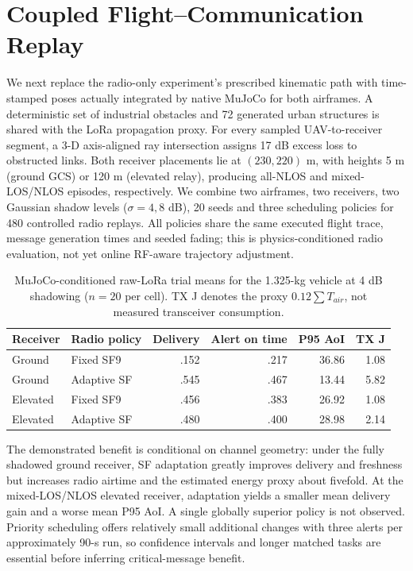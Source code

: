 \documentclass[conference]{IEEEtran}
\begin{document}
\section{Coupled Flight--Communication Replay}
We next replace the radio-only experiment's prescribed kinematic path with time-stamped poses actually integrated by native MuJoCo for both airframes. A deterministic set of industrial obstacles and 72 generated urban structures is shared with the LoRa propagation proxy. For every sampled UAV-to-receiver segment, a 3-D axis-aligned ray intersection assigns 17 dB excess loss to obstructed links. Both receiver placements lie at $(230,220)$ m, with heights 5 m (ground GCS) or 120 m (elevated relay), producing all-NLOS and mixed-LOS/NLOS episodes, respectively. We combine two airframes, two receivers, two Gaussian shadow levels ($\sigma=4,8$ dB), 20 seeds and three scheduling policies for 480 controlled radio replays. All policies share the same executed flight trace, message generation times and seeded fading; this is physics-conditioned radio evaluation, not yet online RF-aware trajectory adjustment.
\begin{table}[t]\centering\caption{MuJoCo-conditioned raw-LoRa trial means for the 1.325-kg vehicle at 4 dB shadowing ($n=20$ per cell). TX J denotes the proxy $0.12 \sum T_{air}$, not measured transceiver consumption.}\label{tab:crosslayer}
\begin{tabular}{llrrrr}\toprule
Receiver & Radio policy & Delivery & Alert on time & P95 AoI & TX J\\\midrule
Ground & Fixed SF9 & .152 & .217 & 36.86 & 1.08\\
Ground & Adaptive SF & .545 & .467 & 13.44 & 5.82\\
Elevated & Fixed SF9 & .456 & .383 & 26.92 & 1.08\\
Elevated & Adaptive SF & .480 & .400 & 28.98 & 2.14\\
\bottomrule\end{tabular}\end{table}
The demonstrated benefit is conditional on channel geometry: under the fully shadowed ground receiver, SF adaptation greatly improves delivery and freshness but increases radio airtime and the estimated energy proxy about fivefold. At the mixed-LOS/NLOS elevated receiver, adaptation yields a smaller mean delivery gain and a worse mean P95 AoI. A single globally superior policy is not observed. Priority scheduling offers relatively small additional changes with three alerts per approximately 90-s run, so confidence intervals and longer matched tasks are essential before inferring critical-message benefit.
\end{document}
